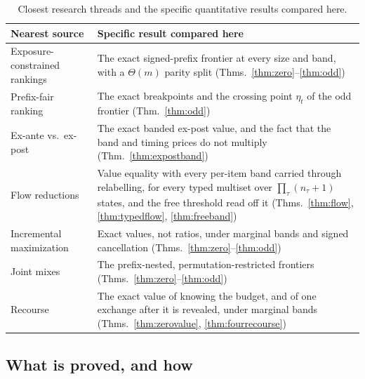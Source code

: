 \begin{table}[h]
\caption{Closest research threads and the specific quantitative results compared here.}
\label{tab:prior}
\centering
\footnotesize
\begin{tabular}{@{}p{}p{}@{}}
\toprule
Nearest source & Specific result compared here \\
\midrule
Exposure-constrained rankings~\cite{singh2018} & The exact signed-prefix frontier at every
size and band, with a $\Theta(m)$ parity split (Thms.~\ref{thm:zero}--\ref{thm:odd}) \\
Prefix-fair ranking~\cite{celis2018} & The exact breakpoints and the crossing point
$\eta_{t}$ of the odd frontier (Thm.~\ref{thm:odd}) \\
Ex-ante vs.\ ex-post~\cite{singh2021,freeman2020} & The exact banded ex-post value, and the
fact that the band and timing prices do not multiply (Thm.~\ref{thm:expostband}) \\
Flow reductions~\cite{schrijver2003} & Value equality with every per-item band carried
through relabelling, for every typed multiset over $\prod_\tau(n_\tau+1)$ states, and the free
threshold read off it (Thms.~\ref{thm:flow}, \ref{thm:typedflow}, \ref{thm:freeband}) \\
Incremental maximization~\cite{disser2023,bienkowski2026} & Exact values, not ratios, under
marginal bands and signed cancellation (Thms.~\ref{thm:zero}--\ref{thm:odd}) \\
Joint mixes~\cite{koike2022} & The prefix-nested, permutation-restricted frontiers
(Thms.~\ref{thm:zero}--\ref{thm:odd}) \\
Recourse~\cite{gupta2022} & The exact value of knowing the budget, and of one exchange after it
is revealed, under marginal bands (Thms.~\ref{thm:zerovalue}, \ref{thm:fourrecourse}) \\
\bottomrule
\end{tabular}
\end{table}

\subsection{What is proved, and how}

